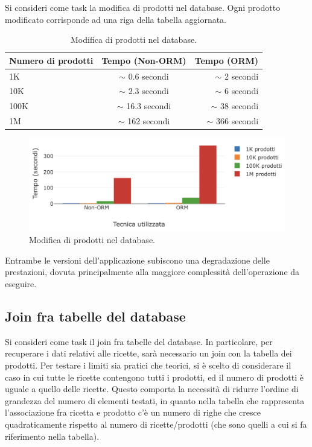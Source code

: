 Si consideri come task la modifica di prodotti nel database. Ogni prodotto modificato corrisponde ad una riga della tabella aggiornata.


\begin{table}[h!]
  \begin{center}
    \caption{Modifica di prodotti nel database.}
    \begin{tabular}{l|c|r} %
      \textbf{Numero di prodotti} & \textbf{Tempo (Non-ORM)} & \textbf{Tempo (ORM)}\\
      \hline
      1K & $\sim$ 0.6 secondi & $\sim$ 2 secondi\\
      10K & $\sim$ 2.3 secondi & $\sim$ 6 secondi\\
      100K & $\sim$ 16.3 secondi & $\sim$ 38 secondi\\
      1M & $\sim$ 162 secondi & $\sim$ 366 secondi\\
    \end{tabular}
  \end{center}
\end{table}

\begin{figure}[H]
  \includegraphics[width=\linewidth]{images/edit-products.png}
  \caption{Modifica di prodotti nel database.}
  \label{fig:editproducts}
\end{figure}

Entrambe le versioni dell'applicazione subiscono una degradazione delle prestazioni, dovuta principalmente alla maggiore complessità dell'operazione da eseguire.

\newpage 

\subsection{Join fra tabelle del database}

Si consideri come task il join fra tabelle del database. In particolare, per recuperare i dati relativi alle ricette, sarà necessario un join con la tabella dei prodotti. Per testare i limiti sia pratici che teorici, si è scelto di considerare il caso in cui tutte le ricette contengono tutti i prodotti, ed il numero di prodotti è uguale a quello delle ricette. Questo comporta la necessità di ridurre l'ordine di grandezza del numero di elementi testati, in quanto nella tabella che rappresenta l'associazione fra ricetta e prodotto c'è un numero di righe che cresce quadraticamente rispetto al numero di ricette/prodotti (che sono quelli a cui si fa riferimento nella tabella).


